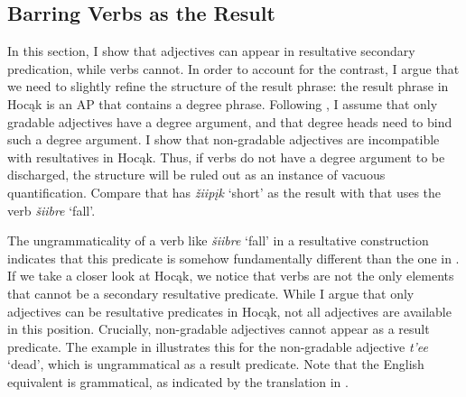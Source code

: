 \documentclass[output=paper]{LSP/langsci}
\begin{document}
\subsection{Barring Verbs as the Result}

In this section, I show that adjectives can appear in resultative secondary predication, while verbs cannot. In order to account for the contrast, I argue that we need to slightly refine the structure of the result phrase: the result phrase in Hocąk is an AP that contains a degree phrase. Following \citet{Corver1997},  I assume that only gradable adjectives have a degree argument, and that degree heads need to bind such a degree argument. I show that non-gradable adjectives are incompatible with resultatives in Hocąk. Thus, if verbs do not have a degree argument to be discharged, the structure will be ruled out as an instance of vacuous quantification. Compare  that has \textit{žiipįk} `short' as the result with  that uses the verb \textit{šiibre} `fall'.

\begin{exe}



\end{exe}

The ungrammaticality of a verb like \textit{šiibre} `fall' in a resultative construction  indicates that this predicate is somehow fundamentally different than the one in . If we take a closer look at Hocąk, we notice that verbs are not the only elements that cannot be a secondary resultative predicate. While I argue that only adjectives can be resultative predicates in Hocąk, not all adjectives are available in this position. Crucially, non-gradable adjectives cannot appear as a result predicate. The example in  illustrates this for the non-gradable adjective \textit{t'ee} `dead', which is ungrammatical as a result predicate. Note that the English equivalent is grammatical, as indicated by the translation in .
\end{document}
